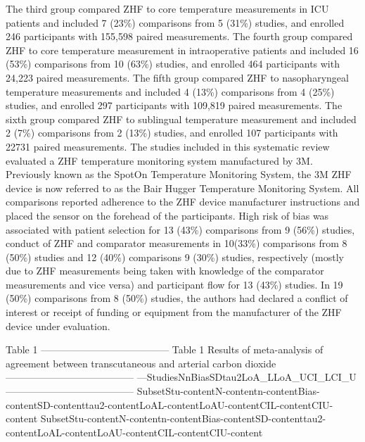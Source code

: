 \documentclass[smallextended]{svjour3}       %
\begin{document}
The third group compared ZHF to core temperature measurements in ICU
patients and included 7 (23\%) comparisons from 5 (31\%) studies, and
enrolled 246 participants with 155,598 paired measurements. The fourth
group compared ZHF to core temperature measurement in intraoperative
patients and included 16 (53\%) comparisons from 10 (63\%) studies, and
enrolled 464 participants with 24,223 paired measurements. The fifth
group compared ZHF to nasopharyngeal temperature measurements and
included 4 (13\%) comparisons from 4 (25\%) studies, and enrolled 297
participants with 109,819 paired measurements. The sixth group compared
ZHF to sublingual temperature measurement and included 2 (7\%)
comparisons from 2 (13\%) studies, and enrolled 107 participants with
22731 paired measurements. The studies included in this systematic
review evaluated a ZHF temperature monitoring system manufactured by 3M.
Previously known as the SpotOn Temperature Monitoring System, the 3M ZHF
device is now referred to as the Bair Hugger Temperature Monitoring
System. All comparisons reported adherence to the ZHF device
manufacturer instructions and placed the sensor on the forehead of the
participants. High risk of bias was associated with patient selection
for 13 (43\%) comparisons from 9 (56\%) studies, conduct of ZHF and
comparator measurements in 10(33\%) comparisons from 8 (50\%) studies
and 12 (40\%) comparisons 9 (30\%) studies, respectively (mostly due to
ZHF measurements being taken with knowledge of the comparator
measurements and vice versa) and participant flow for 13 (43\%) studies.
In 19 (50\%) comparisons from 8 (50\%) studies, the authors had declared
a conflict of interest or receipt of funding or equipment from the
manufacturer of the ZHF device under evaluation.

Table 1
\textbar{}---\textbar{}---\textbar{}---\textbar{}---\textbar{}---\textbar{}---\textbar{}---\textbar{}---\textbar{}---\textbar{}---\textbar{}---\textbar{}---\textbar{}---\textbar{}
\textbar{}Table 1 Results of meta-analysis of agreement between
transcutaneous and arterial carbon dioxide\textbar{}
\textbar{}---\textbar{}---\textbar{}---\textbar{}---\textbar{}---\textbar{}---\textbar{}---\textbar{}---\textbar{}---\textbar{}---\textbar{}---\textbar{}---\textbar{}---\textbar{}
\textbar{}---\textbar{}Studies\textbar{}N\textbar{}n\textbar{}Bias\textbar{}SD\textbar{}tau2\textbar{}LoA\_L\textbar{}LoA\_U\textbar{}CI\_L\textbar{}CI\_U\textbar{}
\textbar{}---\textbar{}---\textbar{}---\textbar{}---\textbar{}---\textbar{}---\textbar{}---\textbar{}---\textbar{}---\textbar{}---\textbar{}---\textbar{}---\textbar{}---\textbar{}
\textbar{}Subset\textbar{}Stu-content\textbar{}N-content\textbar{}n-content\textbar{}Bias-content\textbar{}SD-content\textbar{}tau2-content\textbar{}LoAL-content\textbar{}LoAU-content\textbar{}CIL-content\textbar{}CIU-content\textbar{}
\textbar{}Subset\textbar{}Stu-content\textbar{}N-content\textbar{}n-content\textbar{}Bias-content\textbar{}SD-content\textbar{}tau2-content\textbar{}LoAL-content\textbar{}LoAU-content\textbar{}CIL-content\textbar{}CIU-content\textbar{}
\end{document}

